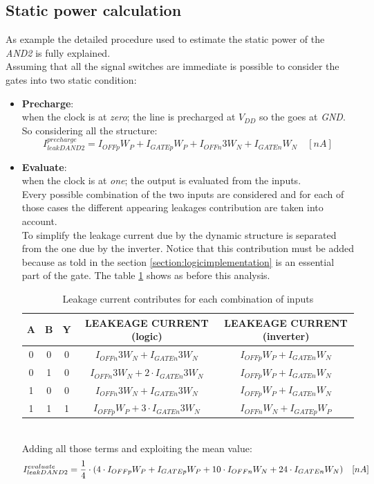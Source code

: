 \documentclass[12pt,  english, makeidx, a4paper, titlepage, oneside]{article}
\begin{document}
\subsection{Static power calculation}
As example the detailed procedure used to estimate the static power of the \textit{AND2} is fully explained.\\
Assuming that all the signal switches are immediate is possible to consider the gates into two static condition:
\begin{itemize}
\item \textbf{Precharge}:\\
when the clock is at \textit{zero}; the line is precharged at \textit{$V_{DD}$} so the goes at \textit{GND}.\\
So considering all the structure:
\begin{equation}
I_{leakDAND2}^{precharge}=  I_{OFFp}W_P+ I_{GATEp}W_P+ I_{OFFn}3W_N+ I_{GATEn}W_N \quad [nA]
\end{equation}
\item \textbf{Evaluate}:\\
when the clock is at \textit{one}; the output is evaluated from the inputs. \\
Every possible combination of the two inputs are considered and for each of those cases the different appearing leakages contribution are taken into account. \\
To simplify the leakage current due by the dynamic structure is separated from the one due by the inverter. Notice that this contribution must be added because as told in the section \ref{section:logicimplementation} is an essential part of the gate.
The table \ref{tab:i_leakage_DYN} shows as before this analysis.
\begin{table}[htb]
\centering
\begin{tabular}{|c|c|c|c|c|}
\hline
A & B & Y & LEAKEAGE CURRENT (logic) & LEAKEAGE CURRENT (inverter)\\
\hline
0 & 0 & 0 & $ I_{OFFn}3W_N + I_{GATEn}3W_N $& $ I_{OFFp}W_P + I_{GATEn}W_N $\\
\hline
0 & 1 & 0 & $ I_{OFFn}3W_N + 2 \cdot I_{GATEn}3W_N $& $ I_{OFFp}W_P + I_{GATEn}W_N $\\
\hline
1 & 0 & 0 & $ I_{OFFn}3W_N + I_{GATEn}3W_N $& $ I_{OFFp}W_P + I_{GATEn}W_N $\\
\hline
1 & 1 & 1 & $ I_{OFFp}W_P + 3\cdot I_{GATEn}3W_N$&
$ I_{OFFn}W_N + I_{GATEp}W_P $\\
\hline
\end{tabular}
\caption{Leakage current contributes for each combination of inputs}
\label{tab:i_leakage_DYN}
\end{table}\\
Adding all those terms and exploiting the mean value:
\begin{equation}
I_{leakDAND2}^{evaluate} =  {1 \over 4} \cdot (4 \cdot I_{OFFp}W_P + I_{GATEp}W_P + 10 \cdot I_{OFFn}W_N+ 24 \cdot I_{GATEn}W_N )\quad [nA]
\end{equation}
\end{itemize}
\end{document}
